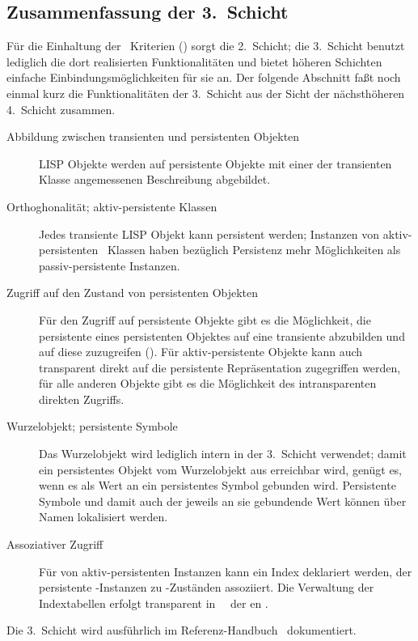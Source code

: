 \subsection{Zusammenfassung der 3.\ Schicht}
%
F\"{u}r die Einhaltung der \acid\ Kriterien (\citepage{\pageref{ref:acid}})
sorgt die 2.~Schicht; die 3.~Schicht benutzt lediglich die
dort realisierten Funktionalit\"{a}ten und bietet h\"{o}heren Schichten
einfache Ein\-bin\-dungs\-m\"{o}g\-lich\-kei\-ten f\"{u}r sie an.
%
Der folgende Abschnitt fa\ss{}t noch einmal kurz die Funktionalit\"{a}ten
der 3.~Schicht aus der Sicht der n\"{a}chsth\"{o}heren 4.~Schicht zusammen.
\begin{description}
%
\item[Abbildung zwischen transienten und persistenten Objekten]
LISP Objekte werden auf persistente Objekte mit einer der
transienten Klasse angemessenen Beschreibung abgebildet.
%
\item[Orthoghonalit\"{a}t; aktiv-persistente Klassen]
Jedes transiente LISP Objekt kann persistent werden;
Instanzen von aktiv-persistenten \clos\ Klassen haben bez\"{u}glich
Persistenz mehr M\"{o}g\-lich\-kei\-ten als passiv-persistente Instanzen.
%
\item[Zugriff auf den Zustand von persistenten Objekten]
F\"{u}r den Zugriff auf persistente Objekte gibt es die
M\"{o}glichkeit, die persistente \representation{} eines persistenten
Objektes auf eine transiente \representation{} abzubilden und auf diese
zuzugreifen (\swizzling\/). F\"{u}r aktiv-persistente Objekte kann
auch transparent direkt auf die persistente Repr\"{a}sentation
zugegriffen werden, f\"{u}r alle anderen Objekte gibt es die M\"{o}glichkeit
des intransparenten direkten Zugriffs.
%
\item[Wurzelobjekt; persistente Symbole]
Das Wurzelobjekt wird lediglich intern in der 3.~Schicht verwendet;
damit ein persistentes Objekt vom Wurzelobjekt aus erreichbar wird,
gen\"{u}gt es, wenn es als Wert an ein persistentes Symbol gebunden wird.
Persistente Symbole und damit auch der jeweils an sie gebundende Wert
k\"{o}n\-nen \"{u}ber Namen lokalisiert werden.
%
\item[Assoziativer Zugriff]
F\"{u}r \Slt[s]\/ von aktiv-persistenten Instanzen kann ein Index
deklariert werden, der persistente \clos-Instanzen zu
\Slt\/-Zust\"{a}nden assoziiert. Die Verwaltung der Indextabellen erfolgt
transparent in \spc[n]\ \mtd[n]\ der \gfn[n]en
.
%
\end{description}
%
Die 3.~Schicht wird ausf\"{u}hrlich im Re\-fe\-renz-Hand\-buch
\cite{bib:ki94b}\ dokumentiert.
%
